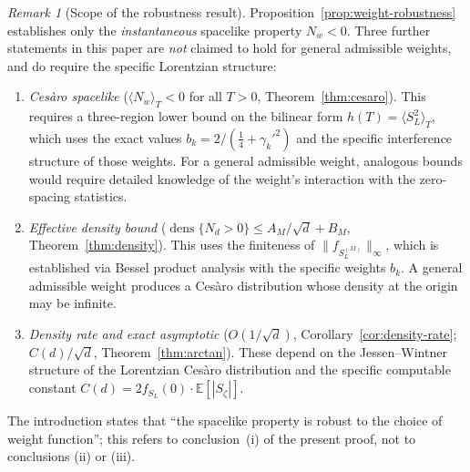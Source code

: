 \documentclass[12pt,reqno]{amsart}
\theoremstyle{plain}
\theoremstyle{definition}
\theoremstyle{remark}
\newtheorem{remark}[theorem]{Remark}
\DeclareMathOperator{\dens}{dens}
\newcommand{\E}{\mathbb{E}}
\begin{document}
\begin{remark}[Scope of the robustness result]\label{rem:robustness-scope}
Proposition~\ref{prop:weight-robustness} establishes only the \emph{instantaneous} spacelike property $N_w < 0$.  Three further statements in this paper are \emph{not} claimed to hold for general admissible weights, and do require the specific Lorentzian structure:
\begin{enumerate}[label=\textup{(\roman*)}]
\item \emph{Ces\`aro spacelike} ($\langle N_w \rangle_T < 0$ for all $T > 0$, Theorem~\ref{thm:cesaro}).  This requires a three-region lower bound on the bilinear form $h(T) = \langle S_L^2 \rangle_T$, which uses the exact values $b_k = 2/({\tfrac{1}{4}} + \gamma_k'^2)$ and the specific interference structure of those weights.  For a general admissible weight, analogous bounds would require detailed knowledge of the weight's interaction with the zero-spacing statistics.

\item \emph{Effective density bound} ($\dens\{N_d > 0\} \leq A_M/\sqrt{d} + B_M$, Theorem~\ref{thm:density}).  This uses the finiteness of $\|f_{S_L^{(M)}}\|_\infty$, which is established via Bessel product analysis with the specific weights $b_k$.  A general admissible weight produces a Ces\`aro distribution whose density at the origin may be infinite.

\item \emph{Density rate and exact asymptotic} ($O(1/\sqrt{d})$, Corollary~\ref{cor:density-rate}; $C(d)/\sqrt{d}$, Theorem~\ref{thm:arctan}).  These depend on the Jessen--Wintner structure of the Lorentzian Ces\`aro distribution and the specific computable constant $C(d) = 2f_{S_L}(0)\cdot\E[|S_\zeta|]$.
\end{enumerate}
The introduction states that ``the spacelike property is robust to the choice of weight function''; this refers to conclusion~(i) of the present proof, not to conclusions (ii) or (iii).
\end{remark}
\end{document}
